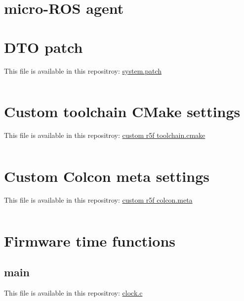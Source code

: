 \documentclass[10pt]{article}
\begin{document}
\section{micro-ROS agent}
\label{sec:orgfcccd56}

\pagebreak
\appendix
\section{DTO patch}
\label{sec:org676a26b}
This file is available in this repositroy: \href{https://gitlab.com/sunoc/xilinx-kria-kv260-documentation/-/blob/b7300116e153f4b5a1542f8804e4646db8030033/src/system.patch}{system.patch}
\inputminted[linenos, frame=single]{diff}{./src/system.patch}

\pagebreak
\section{Custom toolchain CMake settings}
\label{sec:orgc749b92}
This file is available in this repositroy: \href{https://gitlab.com/sunoc/xilinx-kria-kv260-documentation/-/blob/b7300116e153f4b5a1542f8804e4646db8030033/src/custom\_r5f\_toolchain.cmake}{custom r5f toolchain.cmake}
\inputminted[linenos, frame=single]{cmake}{./src/custom_r5f_toolchain.cmake}

\pagebreak
\section{Custom Colcon meta settings}
\label{sec:org56d3e11}
This file is available in this repositroy: \href{https://gitlab.com/sunoc/xilinx-kria-kv260-documentation/-/blob/b7300116e153f4b5a1542f8804e4646db8030033/src/custom\_r5f\_colcon.meta}{custom r5f colcon.meta}
\inputminted[linenos, frame=single]{yaml}{./src/custom_r5f_colcon.meta}

\pagebreak
\section{Firmware time functions}
\label{sec:org875106b}

\subsection{main}
\label{sec:org4d46d8c}
This file is available in this repositroy: \href{https://gitlab.com/sunoc/xilinx-kria-kv260-documentation/-/blob/b7300116e153f4b5a1542f8804e4646db8030033/src/clock.c}{clock.c}
\inputminted[linenos, frame=single]{c}{./src/clock.c}
\end{document}
